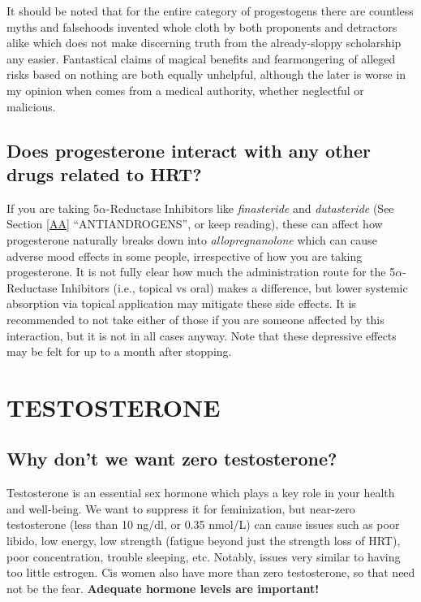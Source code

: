 \documentclass{article}
\begin{document}
It should be noted that for the entire category of progestogens there are countless myths and falsehoods invented whole cloth by both proponents and detractors alike which does not make discerning truth from the already-sloppy scholarship any easier. Fantastical claims of magical benefits and fearmongering of alleged risks based on nothing are both equally unhelpful, although the later is worse in my opinion when comes from a medical authority, whether neglectful or malicious.

\subsection{Does progesterone interact with any other drugs related to HRT?}\label{8-18}

If you are taking 5$\alpha$-Reductase Inhibitors like \textit{finasteride} and \textit{dutasteride} (See Section \ref{AA} “ANTIANDROGENS”, or keep reading), these can affect how progesterone naturally breaks down into \textit{allopregnanolone} which can cause adverse mood effects in some people, irrespective of how you are taking progesterone. It is not fully clear how much the administration route for the 5$\alpha$-Reductase Inhibitors (i.e., topical vs oral) makes a difference, but lower systemic absorption via topical application may mitigate these side effects. It is recommended to not take either of those if you are someone affected by this interaction, but it is not in all cases anyway. Note that these depressive effects may be felt for up to a month after stopping. 
 

\section{TESTOSTERONE}\label{T}

\subsection{Why don’t we want zero testosterone?}

Testosterone is an essential sex hormone which plays a key role in your health and well-being. We want to suppress it for feminization, but near-zero testosterone (less than 10 ng/dl, or 0.35 nmol/L) can cause issues such as poor libido, low energy, low strength (fatigue beyond just the strength loss of HRT), poor concentration, trouble sleeping, etc. Notably, issues very similar to having too little estrogen. Cis women also have more than zero testosterone, so that need not be the fear. \textbf{Adequate hormone levels are important!}
\end{document}
